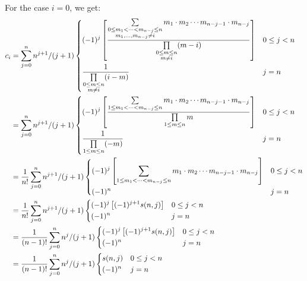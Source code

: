 \documentclass{book}
\begin{document}
\clearpage
For the case $i=0$, we get:
\begin{align}
    c_i &= \sum_{j=0}^{n} n^{j+1}/(j+1) \begin{dcases}
        (-1)^{j} \left[ \frac{\sum\limits_{\substack{0\leq m_1 < \dots < m_{n-j} \leq n \\ m_1, \dots, m_{n-j} \neq i}} m_1 \cdot m_2 \cdots m_{n-j-1} \cdot m_{n-j}}{\prod\limits_{\substack{0\leq m \leq n \\ m \neq i}} (m - i)} \right] & 0 \leq j < n \\
        \frac{1}{\prod\limits_{\substack{0\leq m \leq n \\ m \neq i}} (i - m)} & j = n
    \end{dcases} \nonumber \\
        &= \sum_{j=0}^{n} n^{j+1}/(j+1) \begin{dcases}
        (-1)^{j} \left[ \frac{\sum\limits_{1\leq m_1 < \dots < m_{n-j} \leq n} m_1 \cdot m_2 \cdots m_{n-j-1} \cdot m_{n-j}}{\prod\limits_{\substack{1\leq m \leq n}} m} \right] & 0 \leq j < n \\
        \frac{1}{\prod\limits_{1\leq m \leq n} (- m)} & j = n
    \end{dcases} \nonumber \\
        &= \frac{1}{n!} \sum_{j=0}^{n} n^{j+1}/(j+1) \begin{dcases}
        (-1)^{j} \left[ \sum\limits_{1\leq m_1 < \dots < m_{n-j} \leq n} m_1 \cdot m_2 \cdots m_{n-j-1} \cdot m_{n-j} \right] & 0 \leq j < n \\
        (-1)^n & j = n
    \end{dcases} \nonumber \\
        &= \frac{1}{n!} \sum_{j=0}^{n} n^{j+1}/(j+1) \begin{dcases}
        (-1)^{j} \left[ (-1)^{j+1} s(n, j) \right] & 0 \leq j < n \\
        (-1)^n & j = n
    \end{dcases} \nonumber \\
        &= \frac{1}{(n-1)!} \sum_{j=0}^{n} n^{j}/(j+1) \begin{dcases}
        (-1)^{j} \left[ (-1)^{j+1} s(n, j) \right] & 0 \leq j < n \\
        (-1)^n & j = n
    \end{dcases} \nonumber \\
        &= \frac{1}{(n-1)!} \sum_{j=0}^{n} n^{j}/(j+1) \begin{dcases}
        s(n, j) & 0 \leq j < n \\
        (-1)^n & j = n
    \end{dcases} \nonumber
\end{align}
\end{document}
